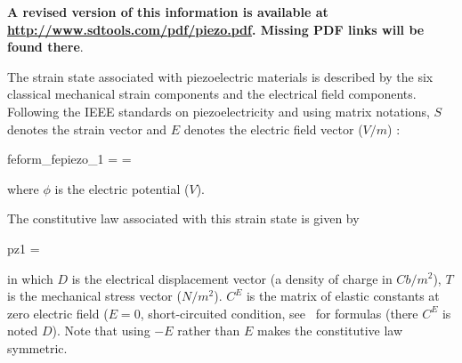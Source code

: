 \begin{SDT}




{\bf A revised version of this information is available at \url{http://www.sdtools.com/pdf/piezo.pdf}.  Missing PDF links will be found there\label{s*pz_ce3D}\label{s*pz_volume}\label{s*pz_ide}\label{s*fepiezoshell}\label{s*pztheory}\label{s*pz_tuto}}. 

The strain state associated with piezoelectric materials is described by the six classical mechanical strain components and the electrical field components. Following the IEEE standards on piezoelectricity and using matrix notations, $S$ denotes the strain vector and $E$ denotes the electric field vector ($V/m$) :

\begin{eqsvg}{feform_fepiezo_1}
 =
=
\end{eqsvg}
where $\phi$ is the electric potential ($V$).

The constitutive law associated with this strain state is given by
%
\begin{eqsvg}{pz1}
 = 
\end{eqsvg}
in which $D$ is the electrical displacement vector (a density of charge in $Cb/m^2$), $T$ is the mechanical stress vector ($N/m^2$). $C^E$ is the matrix of elastic constants at zero electric field ($E=0$, short-circuited condition, see~ for formulas (there $C^E$ is noted $D$). Note that using $-E$ rather than $E$ makes the constitutive law symmetric.



\end{SDT}
